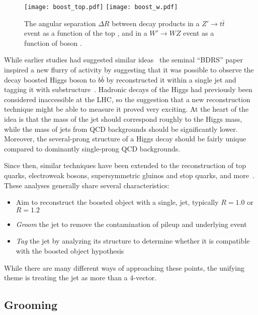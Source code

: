 
\begin{figure}
\centering
\texttt{[image: boost\_top.pdf]}
\texttt{[image: boost\_w.pdf]}
\label{fig:jets:boost}
\caption{The angular separation $\Delta R$ between decay products in a $Z'\rightarrow t\bar{t}$ event as a function of the top \pt, and in a $W'\rightarrow WZ$ event as a function of boson \pt.}
\end{figure}




While earlier studies had suggested similar ideas~\cite{Seymour:1993mx,Butterworth:2002tt} the seminal ``BDRS'' paper inspired a new flurry of activity by suggesting that it was possible to observe the decay boosted Higgs boson to $b\bar{b}$ by reconstructed  it within a single jet and tagging it with substructure~\cite{BDRS}. Hadronic decays of the Higgs had previously been considered inaccessible at the LHC, so the suggestion that a new reconstruction technique might be able to measure it proved very exciting. At the heart of the idea is that the mass of the jet should correspond roughly to the Higgs mass, while the mass of jets from QCD backgrounds should be significantly lower. Moreover, the several-prong structure of a Higgs decay should be fairly unique compared to dominantly single-prong QCD backgrounds.

Since then, similar techniques have been extended to the reconstruction of top quarks, electroweak bosons, supersymmetric gluinos and stop quarks, and more~\cite{Anders:2013oga,Plehn:2009rk,Rehermann:2010vq,Bai:2013xla,Larkoski:2014wba,EEC,ATLAS:2012dp}. These analyses generally share several characteristics:
%
\begin{itemize}
\item Aim to reconstruct the boosted object with a single, \largeR jet, typically $R=1.0$ or $R=1.2$
\item \textit{Groom} the jet to remove the contamination of pileup and underlying event 
\item \textit{Tag} the jet by analyzing its structure to determine whether it is compatible with the boosted object hypothesis
\end{itemize}
%
While there are many different ways of approaching these points, the unifying theme is treating the jet as more than a 4-vector. 

\subsection{Grooming}
\label{chapter:jets-and-substructure:grooming}

